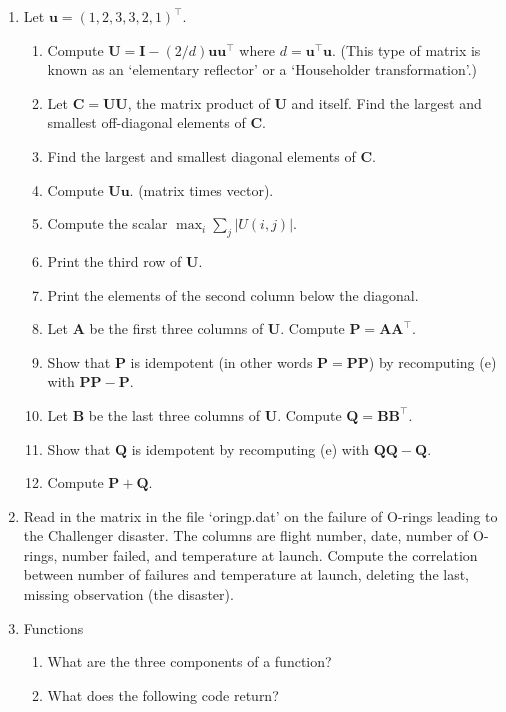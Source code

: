 \documentclass[12pt]{report}
\newcommand{\Vec}[1]{\bm{#1}}
\begin{document}
\begin{enumerate}
\item Let $\Vec{u} = (1, 2, 3, 3, 2, 1)^\top$.  
    \begin{enumerate}[label={\alph*}]
        \item Compute $\Vec{U} = \Vec{I} - (2/d) \Vec{u} \Vec{u}^\top$ where $d = \Vec{u}^\top \Vec{u}$.  (This type of matrix is known as an `elementary reflector' or a `Householder transformation'.)
        \item Let $\Vec{C} = \Vec{U}  \Vec{U}$, the matrix product of $\Vec{U}$ and itself.  Find the largest and smallest off-diagonal elements of $\Vec{C}$.
        \item Find the largest and smallest diagonal elements of $\Vec{C}$.
        \item Compute $\Vec{U} \Vec{u}$.  (matrix times vector).
        \item Compute the scalar $\max_i \sum_j |U(i, j)| $.
        \item Print the third row of $\Vec{U}$.
        \item Print the elements of the second column below the diagonal.
        \item Let $\Vec{A}$ be the first three columns of $\Vec{U}$.  Compute $\Vec{P} = \Vec{A} \Vec{A}^\top$.
        \item Show that $\Vec{P}$ is idempotent (in other words $\Vec{P} = \Vec{P}\Vec{P}$) by recomputing (e) with $\Vec{P}\Vec{P} - \Vec{P}$.
        \item Let $\Vec{B}$ be the last three columns of $\Vec{U}$.  Compute $\Vec{Q} = \Vec{B}\Vec{B}^\top$.
        \item Show that $\Vec{Q}$ is idempotent by recomputing (e) with $\Vec{Q} \Vec{Q} - \Vec{Q}$.
        \item Compute $\Vec{P} + \Vec{Q}$.
    \end{enumerate}
    
\item Read in the matrix in the file `oringp.dat' on the failure of O-rings leading to the Challenger disaster.
The columns are flight number, date, number of O-rings, number failed, and temperature at launch.
Compute the correlation between number of failures and temperature at launch, deleting the last, missing observation (the disaster).

\item Functions
    \begin{enumerate}[label={\alph*}]
        \item What are the three components of a function?
        \item What does the following code return?


\end{enumerate}
\end{enumerate}
\end{document}
